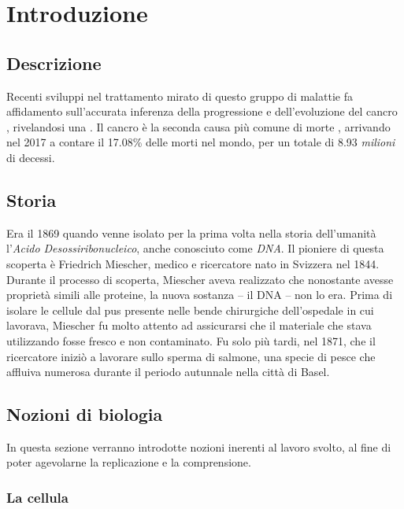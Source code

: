 
\chapter{Introduzione}
\label{chap:intro}


\section{Descrizione}
\label{chap:intro-description}
Recenti sviluppi nel trattamento mirato di questo gruppo di malattie fa affidamento sull'accurata inferenza della progressione e dell'evoluzione del cancro \cite{Ciccolella268243}, rivelandosi una . Il cancro è la seconda causa più comune di morte \cite{worldindatacancer}, arrivando nel 2017 a contare il 17.08\% delle morti nel mondo, per un totale di 8.93 \textit{milioni} di decessi.


\section{Storia}
\label{chap:intro-history}

Era il 1869 quando venne isolato per la prima volta nella storia dell'umanità l'\textit{Acido Desossiribonucleico}, anche conosciuto come \textit{DNA}. Il pioniere di questa scoperta è Friedrich Miescher, medico e ricercatore nato in Svizzera nel 1844. Durante il processo di scoperta, Miescher aveva realizzato che nonostante  avesse proprietà simili alle proteine, la nuova sostanza -- il DNA -- non lo era. Prima di isolare le cellule dal pus presente nelle bende chirurgiche dell'ospedale in cui lavorava, Miescher fu molto attento ad assicurarsi che il materiale che stava utilizzando fosse fresco e non contaminato. Fu solo più tardi, nel 1871, che il ricercatore iniziò a lavorare sullo sperma di salmone, una specie di pesce che affluiva numerosa durante il periodo autunnale nella città di Basel.


\section{Nozioni di biologia}
\label{chap:intro-biology}

In questa sezione verranno introdotte nozioni inerenti al lavoro svolto, al fine di poter agevolarne la replicazione e la comprensione.

\subsection{La cellula}
\label{chap:intro-biology-cell}

